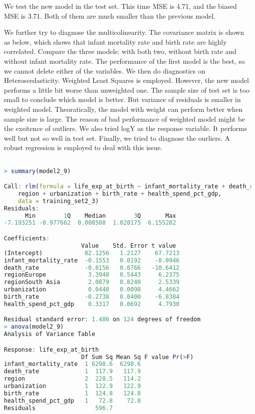 We test the new model in the test set. This time MSE is 4.71, and the biased MSE is 3.71. Both of them are much smaller than the previous model.

We further try to diagnose the multicolinearity. The covariance matrix is shown as below, which shows that infant mortality rate and birth rate are highly correlated. Compare the three models: with both two, without birth rate and without infant mortality rate. The performance of the first model is the best, so we cannot delete either of the variables.
We then do diagnostics on Heteroscedasticity. Weighted Least Squares is employed. However, the new model performs a little bit worse than unweighted one. The sample size of test set is too small to conclude which model is better. But variance of residuals is smaller in weighted model. Theoratically, the model with weight can perform better when sample size is large. The reason of bad performance of weighted model might be the exsitence of outliers.
We also tried logY as the response variable. It performs well but not so well in test set.
Finally, we tried to diagnose the ourliers. A robust regression is employed to deal with this issue. 

\begin{lstlisting}[language=R, caption=Result of the model]

> summary(model2_9)

Call: rlm(formula = life_exp_at_birth ~ infant_mortality_rate + death_rate + 
    region + urbanization + birth_rate + health_spend_pct_gdp, 
    data = training_set2_3)
Residuals:
      Min        1Q    Median        3Q       Max 
-7.193251 -0.977662  0.008508  1.020175  6.155282 

Coefficients:
                      Value    Std. Error t value 
(Intercept)            82.1256   1.2127    67.7213
infant_mortality_rate  -0.1553   0.0192    -8.0946
death_rate             -0.8156   0.0766   -10.6412
regionEurope            3.3948   0.5443     6.2375
regionSouth Asia        2.0879   0.8240     2.5339
urbanization            0.0440   0.0098     4.4662
birth_rate             -0.2738   0.0400    -6.8384
health_spend_pct_gdp    0.3317   0.0692     4.7930

Residual standard error: 1.486 on 124 degrees of freedom
> anova(model2_9)
Analysis of Variance Table

Response: life_exp_at_birth
                      Df Sum Sq Mean Sq F value Pr(>F)
infant_mortality_rate  1 6298.6  6298.6               
death_rate             1  117.9   117.9               
region                 2  228.5   114.2               
urbanization           1  122.9   122.9               
birth_rate             1  124.8   124.8               
health_spend_pct_gdp   1   72.8    72.8               
Residuals                 596.7     

\end{lstlisting}



